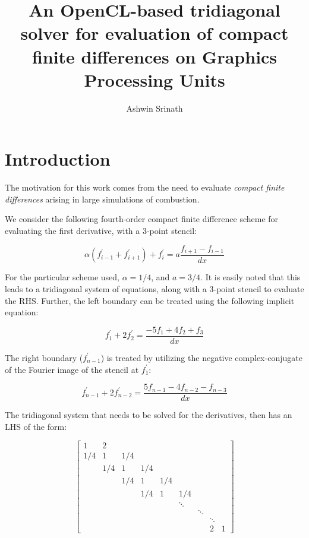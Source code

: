 \documentclass{article}
\author{Ashwin Srinath}
\title{An OpenCL-based tridiagonal solver for evaluation
    of compact finite differences on Graphics Processing Units}
\begin{document}

\section{Introduction}

The motivation for this work comes from the need to evaluate
\emph{compact finite differences} arising in large simulations of
combustion.

We consider the following fourth-order
compact finite difference scheme for evaluating the first derivative,
with a 3-point stencil:

\begin{equation}
    \alpha(f^{\prime}_{i-1} + f^{\prime}_{i+1}) + f^{\prime}_i
    =
    a\frac{f_{i+1} - f_{i-1}}{dx}
\end{equation}

For the particular scheme used, $\alpha = 1/4$,
and $ a = 3/4 $.
It is easily noted that this leads to a tridiagonal system of equations,
along with a 3-point stencil to evaluate the RHS.
Further, the left boundary can be treated using the following implicit equation:

\begin{equation}
    f^{\prime}_1 + 2f^{\prime}_2 = \frac{-5f_1 + 4f_2 + f_3}{dx}
\end{equation}

The right boundary ($f^{\prime}_{n-1}$) is treated by utilizing
the negative complex-conjugate of the Fourier image of the stencil
at $f^{\prime}_1$:

\begin{equation}
    f^{\prime}_{n-1} + 2f^{\prime}_{n-2}
    =
    \frac{5f_{n-1} - 4f_{n-2} - f_{n-3}}{dx}
\end{equation}

The tridiagonal system that needs to be solved for the derivatives,
then has an LHS of the form:

\[ %
 \begin{bmatrix}
     1&2\\
     1/4&1&1/4\\
     &1/4&1&1/4\\
     &&1/4&1&1/4\\
     &&&1/4&1&1/4\\
     &&&&&\ddots\\
     &&&&&&\ddots\\
     &&&&&&&\ddots\\
     &&&&&&&2&1
  \end{bmatrix}
\]
\end{document}
